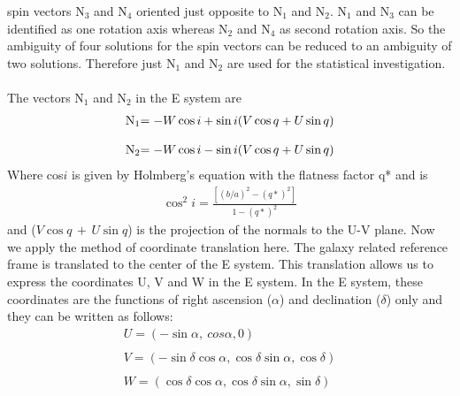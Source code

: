 spin vectors N$_3$ and N$_4$ oriented just opposite to N$_1$ and
N$_2$. N$_1$ and N$_3$ can be identified as one rotation axis
whereas N$_2$ and N$_4$ as second rotation axis. So the ambiguity
of four solutions for the spin vectors can be reduced to an
ambiguity of two solutions. Therefore just N$_1$ and N$_2$ are
used for the statistical investigation.
\\
\\
The vectors N$_1$ and N$_2$ in the E system are
\begin{equation}\label{N}
\begin{array}{l}
$N$_1$$ = - W\cos i + \sin i (V \cos q + U \sin q)\\
\\
$N$_2$$ = - W\cos i - \sin i (V \cos q + U \sin q)\\
\end{array}
\end{equation}
Where cos$i$ is given by Holmberg's equation with the flatness
factor q* and is
\begin{equation}
\begin{array}{l}
\cos^2 i = \frac{[(b/a)^2 - (q*)^2]}{1 - (q*)^2}
\end{array}
\end{equation}
and ($V\cos q\, +\, U\sin q$) is the projection of the normals to the U-V
plane. Now we apply the method of coordinate translation here. The
galaxy related reference frame is translated to the center of the
E system. This translation allows us to express the coordinates U,
V and W in the E system. In the E system, these coordinates are
the functions of right ascension ($\alpha$) and declination
($\delta$) only and they can be written as follows:
\begin{equation}\label{UVW}
\begin{array}{l}
U = (-\sin \alpha, \ cos \alpha, 0)\\
\\
V = (-\sin \delta\cos \alpha, \cos \delta\sin \alpha, \cos \delta)\\
\\
W = (\cos \delta\cos \alpha, \cos \delta\sin \alpha, \sin \delta)\\
\\
\end{array}
\end{equation}

